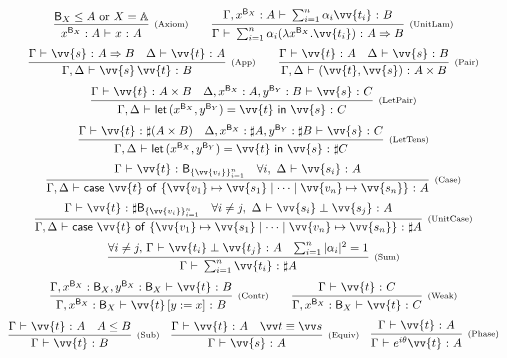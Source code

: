 \documentclass[runningheads,orivec,envcountsame,envcountsect]{llncs}
\newcommand\AbsBasis{\ensuremath{\mathbb{A}}}
\def\Pair#1#2{(#1,#2)} %
\def\Lam#1#2#3{\lambda#1^{#2}{.}#3} %
\def\letkeyword{\mathsf{let}}
\def\inkeyword{\mathsf{in}}
\def\LetP#1#2#3#4#5#6{\letkeyword\,\Pair{#1^{#2}}{#3^{#4}}=#5~\inkeyword~#6}
\def\gencase#1#2#3#4#5{\ensuremath{\mathsf{case}~#1~\mathsf{of}~\{#2\mapsto #4 \mid \dotsb \mid #3\mapsto #5\}}}
\def\Arr{\Rightarrow}
\def\SUB#1#2{#1\le#2}
\def\TYP#1#2#3{#1~{\vdash}~#2~{:}~#3}
\def\SORTH#1#2#3#4{#1~{\vdash}~#2\perp#3~{:}~#4}
\def\snam#1{\textsc{\scriptsize\upshape(#1)}}
\newcommand\basis[1]{\ensuremath{\mathsf{B}_{#1}}}
\newcommand\genbasis[3]{\ensuremath{\basis{\{#1\}_{#2}^{#3}}}}
\begin{document}
\begin{table}[t]
  \[
    \begin{array}{c}
      \infer[\snam{Axiom}]{\TYP{x^{\basis{X}}:A}{x}{A}}{\basis{X}\leq A \text{ or }X=\AbsBasis}
      \qquad
	\infer[\snam{UnitLam}]{\TYP{\Gamma}{\sum_{i=1}^n \alpha_i (\Lam{x}{\basis{X}}{\vv{t_i}})}{A\Arr B}}
	{\TYP{\Gamma,x^{\basis{X}}:A}{\sum_{i=1}^{n}\alpha_i\vv{t_i}}{B}}
      \\
      \noalign{\medskip}
      \infer[\snam{App}]{\TYP{\Gamma,\Delta}{\vv{s}\,\vv{t}}{B}}
      {\TYP{\Gamma}{\vv{s}}{A\Arr B} & \TYP{\Delta}{\vv{t}}{A}}
      \qquad
      \infer[\snam{Pair}]{\TYP{\Gamma,\Delta}
      {\Pair{\vv{t}}{\vv{s}}}{A\times B}}{
	\TYP{\Gamma}{\vv{t}}{A}&\TYP{\Delta}{\vv{s}}{B}
      }
      \\
      \noalign{\medskip}
      \infer[\snam{LetPair}]{\TYP{\Gamma,\Delta} 
      {\LetP{x}{{\basis{X}}}{y}{{\basis{Y}}}{\vv{t}}{\vv{s}}}{C}}{
	\TYP{\Gamma}{\vv{t}}{A\times B}&
	\TYP{\Delta,x^{{\basis{X}}}:A,y^{{\basis{Y}}}:B}{\vv{s}}{C}
      }\\
      \noalign{\medskip}
      \infer[\snam{LetTens}]{\TYP{\Gamma,\Delta}
      {\LetP{x}{{\basis{X}}}{y}{{\basis{Y}}}{\vv{t}}{\vv{s}}}{\sharp C}}{
	\TYP{\Gamma}{\vv{t}}{\sharp(A\times B)}&
	\TYP{\Delta,x^{{\basis{X}}}:\sharp A,y^{{\basis{Y}}}:\sharp B}{\vv{s}}{C}
      }\\
      \noalign{\medskip}
      \infer[\snam{Case}]{\TYP{\Gamma,\Delta}
      {\gencase{\vv{t}}{\vv{v_1}}{\vv{v_n}}{\vv{s_1}}{\vv{s_n}}}{A}}{
	\TYP{\Gamma}{\vv{t}}{\genbasis{\vv{v_i}}{i=1}{n}}&
	\forall i,\ \TYP{\Delta}{\vv{s_i}}{A}
      }\\
      \noalign{\medskip}
      \infer[\snam{UnitCase}]{\TYP{\Gamma,\Delta}
      {\gencase{\vv{t}}{\vv{v_1}}{\vv{v_n}}{\vv{s_1}}{\vv{s_n}}}{\sharp A}}{
	\TYP{\Gamma}{\vv{t}}{\sharp \genbasis{\vv{v_i}}{i=1}{n}}&
	\forall i\neq j,\ \SORTH{\Delta}{\vv{s_i}}{\vv{s_j}}{A}
      }\\
      \noalign{\medskip}
      \infer[\snam{Sum}]
      {\TYP{\Gamma}{\sum_{i=1}^{n} \vv{t_i}}{\sharp A}}
      {\forall i\neq j,\, \SORTH{\Gamma}{\vv{t_i}}{\vv{t_j}}{A} &
      \sum_{i=1}^{n}|\alpha_i|^2 = 1}
      \\
      \noalign{\medskip}
      \infer[\snam{Contr}]{\TYP{\Gamma,x^{\basis{X}}:{\basis{X}}}{\vv{t}\,[y:=x]}{B}}{
	\TYP{\Gamma,x^{\basis{X}}:{\basis{X}},y^{\basis{X}}:{\basis{X}}}{\vv{t}}{B}
      } 
      \qquad
	\infer[\snam{Weak}]{\TYP{\Gamma,x^{\basis{X}}:\basis{X}}{\vv{t}}{C}}{
	  \TYP{\Gamma}{\vv{t}}{C}
	}
      \\
      \noalign{\medskip}
      \infer[\snam{Sub}]{\TYP{\Gamma}{\vv{t}}{B}}{\TYP{\Gamma}{\vv{t}}{A} & \SUB{A}{B}}
      \quad
      \infer[\snam{Equiv}]{\TYP{\Gamma}{\vv{s}}{A}}{
	\TYP{\Gamma}{\vv{t}}{A}& \vv t\equiv \vv s
      }
      \quad 
      \infer[\snam{Phase}]{\TYP{\Gamma}{e^{i\theta}\vv{t}}{A}}
      {\TYP{\Gamma}{\vv{t}}{A}}
    \end{array}
  \]
  \caption{Some valid typing rules}
  \label{tab:TypingRules}
\end{table}
\end{document}
